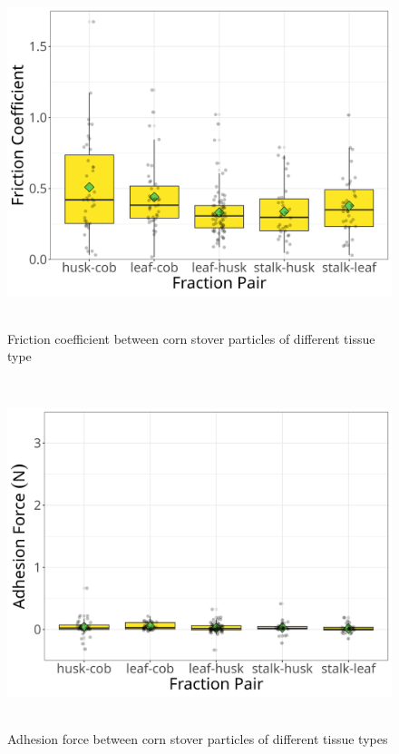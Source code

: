 \documentclass[xcolor=dvipsnames,10pt,hidelinks]{article}
\begin{document}
\begin{figure}[htbp]
\centering
\includegraphics[height=4in]{./figures/cs_cs_different_fraction_coeff_mu_box_plt.png}
\caption{\label{fig:org4d3e456}Friction coefficient between corn stover particles of different tissue type}
\end{figure}

\newpage

\begin{figure}[htbp]
\centering
\includegraphics[height=4in]{./figures/cs_cs_different_fraction_coeff_c_box_plt.png}
\caption{\label{fig:orga7dd0ce}Adhesion force between corn stover particles of different tissue types}
\end{figure}
\end{document}
